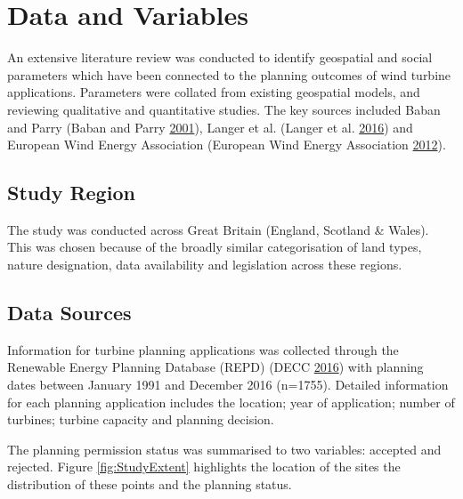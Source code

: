 \documentclass[a4paper,]{article}
\theoremstyle{definition}
\theoremstyle{definition}
\theoremstyle{remark}
\begin{document}
{\section{Data and Variables}\label{data-and-variables}

An extensive literature review was conducted to identify geospatial and
social parameters which have been connected to the planning outcomes of
wind turbine applications. Parameters were collated from existing
geospatial models, and reviewing qualitative and quantitative studies.
The key sources included Baban and Parry (Baban and Parry
\protect\hyperlink{ref-Baban2001}{2001}), Langer et al. (Langer et al.
\protect\hyperlink{ref-Langer2016a}{2016}) and European Wind Energy
Association (European Wind Energy Association
\protect\hyperlink{ref-EuropeanWindEnergyAssociation2012}{2012}).

\subsection{Study Region}\label{study-region}

The study was conducted across Great Britain (England, Scotland \&
Wales). This was chosen because of the broadly similar categorisation of
land types, nature designation, data availability and legislation across
these regions.

\subsection{Data Sources}\label{data-sources}

Information for turbine planning applications was collected through the
Renewable Energy Planning Database (REPD) (DECC
\protect\hyperlink{ref-DECC2016}{2016}) with planning dates between
January 1991 and December 2016 (n=1755). Detailed information for each
planning application includes the location; year of application; number
of turbines; turbine capacity and planning decision.

The planning permission status was summarised to two variables: accepted
and rejected. Figure \ref{fig:StudyExtent} highlights the location of
the sites the distribution of these points and the planning status.

}
\end{document}
